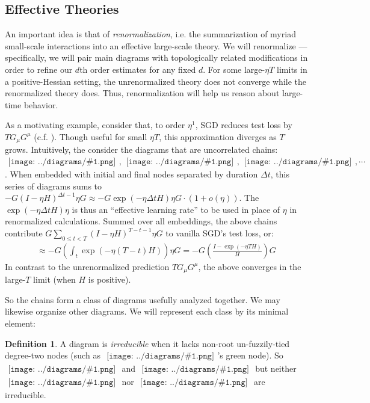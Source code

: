 \documentclass{article}
\theoremstyle{plain}
\theoremstyle{definition}
\newtheorem{defn}{Definition}
\newcommand{\wrap}[1]{\left(#1\right)}
\newcommand{\sdia}[1]{\begin{gathered}\texttt{[image: ../diagrams/\#1.png]}\end{gathered}}
\begin{document}
    \subsection{Effective Theories} \label{subsect:effective}
        An important idea is that of \emph{renormalization}, i.e. the
        summarization of myriad small-scale interactions into an effective
        large-scale theory.  We will renormalize --- specifically, we will
        pair main diagrams with topologically related modifications in order
        to refine our $d$th order estimates for any fixed $d$.  For
        some large-$\eta T$ limits in a positive-Hessian setting, the
        unrenormalized theory does not converge while the renormalized theory
        does.  Thus, renormalization will help us reason about large-time
        behavior. 

        As a motivating example, consider that, to order $\eta^1$, SGD reduces
        test loss by $T G_\mu G^\mu$ (c.f. \citet{ne04}).  Though useful for
        small $\eta T$, this approximation diverges as $T$ grows.  Intuitively,
        the  consider the diagrams that are uncorrelated chains:
        $
            \sdia{(0-1)(01)}, \sdia{(0-1-2)(01-12)},
            \sdia{(0-1-2-3)(01-12-23)}, \cdots
        $.  
        When embedded with initial and final nodes separated by duration
        $\Delta t$, this series of diagrams sums to
        $
            -G (I-\eta H)^{\Delta t-1} \eta G
            \approx
            -G \exp(-\eta \Delta t H) \eta G
            \cdot (1+o(\eta))
        $.
        The $\exp(-\eta \Delta t H) \eta$ is thus an ``effective learning rate'' to
        be used in place of $\eta$ in renormalized calculations.
        Summed over all embeddings, the above chains contribute 
        $G \sum_{0\leq t<T} (I-\eta H)^{T-t-1} \eta G$
        to vanilla SGD's test loss, or:
        \begin{align*}
            \approx
            -G \wrap{\int_t \exp(-\eta (T-t) H)} \eta G
            =
            -G \wrap{\frac{I - \exp(-\eta T H)}{H}} G
        \end{align*}
        In contrast to the unrenormalized prediction $T G_\mu G^\mu$,
        the above converges in the large-$T$ limit (when $H$ is positive).

        So the chains form a class of diagrams usefully analyzed
        together.  We may likewise organize other diagrams.  We will
        represent each class by its minimal element:
        \begin{defn}
            A diagram is \emph{irreducible} when it lacks non-root
            un-fuzzily-tied degree-two nodes (such as $\sdia{(0-1-2)(01-12)}$'s
            {\color{moog}green} node).
            So
            $\sdia{(0-1-2)(02-12)}$ and
            $\sdia{(01-2)(01-12)}$
            but neither
            $\sdia{(0-1-2)(01-12)}$ nor
            $\sdia{(02-1-3)(01-12-23)}$
            are irreducible.
        \end{defn}
\end{document}
